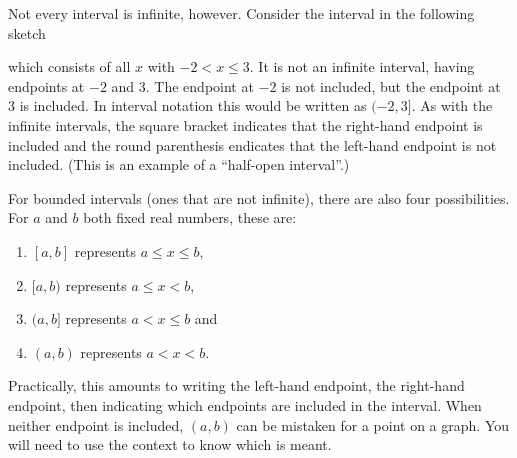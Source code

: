 \documentclass[noauthor, nooutcomes]{ximera}
\begin{document}
	Not every interval is infinite, however. Consider the interval in the following sketch
	\begin{image}
	\end{image}
	which consists of all $x$ with $-2 < x \leq 3$. It is not an infinite interval, having endpoints at $-2$ and $3$. The endpoint at $-2$ is not included, but the endpoint at $3$ is included. In interval notation this would be written as $(-2, 3]$. As with the infinite intervals,
	the square bracket indicates that the right-hand endpoint is included and the round parenthesis endicates that the left-hand endpoint is not included. (This is an example of a ``half-open interval''.)

	For bounded intervals (ones that are not infinite), there are also four possibilities. For $a$ and $b$ both fixed real numbers, these are:
	\begin{enumerate}
		\item $[a, b]$ represents $a \leq x \leq b$,
		\item $[a, b)$ represents $a \leq x < b$,
		\item $(a, b]$ represents $a < x \leq b$ and
		\item $(a, b)$ represents $a < x < b$.
	\end{enumerate}
	Practically, this amounts to writing the left-hand endpoint, the right-hand endpoint, then indicating which endpoints are included in the interval. When neither endpoint is included, $(a,b)$ can be mistaken for a point on a graph. You will need to use the context
	to know which is meant.
\end{document}
